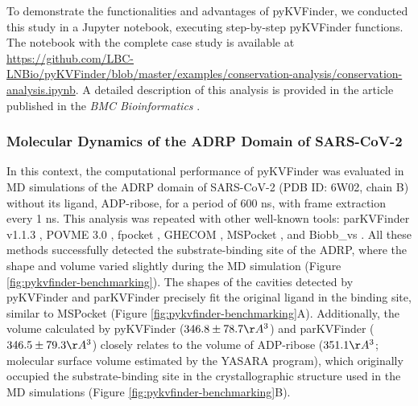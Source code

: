 \documentclass[Ingles]{phdthesis}
\begin{document}
To demonstrate the functionalities and advantages of pyKVFinder, we conducted this study in a Jupyter notebook, executing step-by-step pyKVFinder functions. The notebook with the complete case study is available at \url{https://github.com/LBC-LNBio/pyKVFinder/blob/master/examples/conservation-analysis/conservation-analysis.ipynb}. A detailed description of this analysis is provided in the article published in the \textit{BMC Bioinformatics} \cite{guerra2021}.

\subsubsection{Molecular Dynamics of the ADRP Domain of SARS-CoV-2 \label{sec:pykvfinder-md-analysis}}

In this context, the computational performance of pyKVFinder was evaluated in \acs{MD} simulations of the ADRP domain of SARS-CoV-2 (PDB ID: 6W02, chain B) without its ligand, ADP-ribose, for a period of 600 ns, with frame extraction every 1 ns. This analysis was repeated with other well-known tools: parKVFinder v1.1.3 \cite{guerra2020}, POVME 3.0 \cite{povme}, fpocket \cite{fpocket}, GHECOM \cite{ghecom}, MSPocket \cite{mspocket}, and Biobb\_vs \cite{biobbvs}. All these methods successfully detected the substrate-binding site of the ADRP, where the shape and volume varied slightly during the MD simulation (Figure \ref{fig:pykvfinder-benchmarking}). The shapes of the cavities detected by pyKVFinder and parKVFinder precisely fit the original ligand in the binding site, similar to MSPocket (Figure \ref{fig:pykvfinder-benchmarking}A). Additionally, the volume calculated by pyKVFinder ($346.8 \pm 78.7 \AA^3$) and parKVFinder ($346.5 \pm 79.3 \AA^3$) closely relates to the volume of ADP-ribose ($351.1 \AA^3$; molecular surface volume estimated by the YASARA program), which originally occupied the substrate-binding site in the crystallographic structure used in the MD simulations (Figure \ref{fig:pykvfinder-benchmarking}B).
\end{document}
